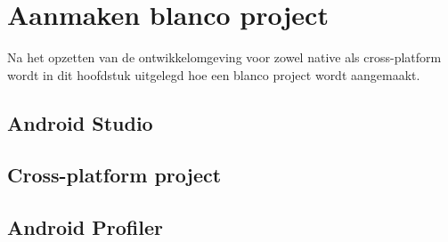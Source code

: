 
\chapter{Aanmaken blanco project}%
\label{ch:projecten}

Na het opzetten van de ontwikkelomgeving voor zowel native als cross-platform wordt 
in dit hoofdstuk uitgelegd hoe een blanco project wordt aangemaakt.

\section{Android Studio}



\section{Cross-platform project}\label{sec:projectencross}



\section{Android Profiler}

